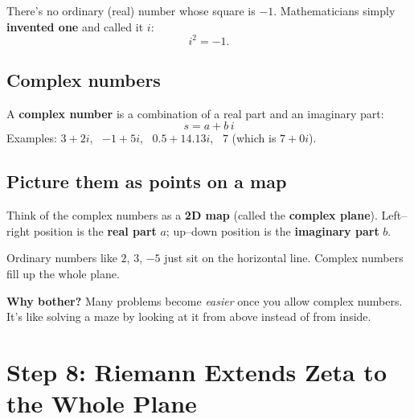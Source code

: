 \documentclass[11pt,a4paper]{article}
\begin{document}
There's no ordinary (real) number whose square is $-1$. Mathematicians simply \textbf{invented one} and called it $i$:
\[
i^2 = -1.
\]

\subsection*{Complex numbers}

A \textbf{complex number} is a combination of a real part and an imaginary part:
\[
s = a + b\,i
\]
Examples: $3 + 2i$, \ $-1 + 5i$, \ $0.5 + 14.13i$, \ $7$ (which is $7 + 0i$).

\subsection*{Picture them as points on a map}

Think of the complex numbers as a \textbf{2D map} (called the \textbf{complex plane}). Left--right position is the \textbf{real part} $a$; up--down position is the \textbf{imaginary part} $b$.

\begin{center}
\end{center}

Ordinary numbers like $2$, $3$, $-5$ just sit on the horizontal line. Complex numbers fill up the whole plane.

\textbf{Why bother?} Many problems become \emph{easier} once you allow complex numbers. It's like solving a maze by looking at it from above instead of from inside.

\section{Step 8: Riemann Extends Zeta to the Whole Plane}
\end{document}
